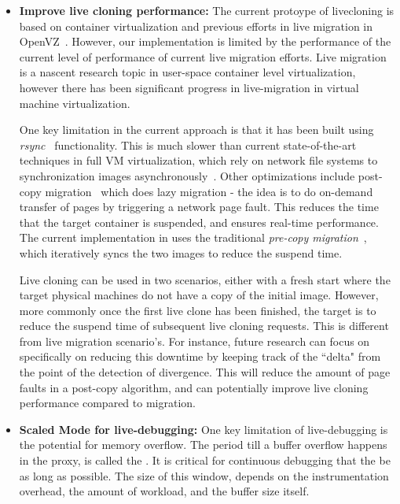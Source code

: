 \begin{itemize}
	\item \textbf{Improve live cloning performance:}
	The current protoype of livecloning is based on container virtualization and previous efforts in live migration in OpenVZ~\cite{openvz}.
	However, our implementation is limited by the performance of the current level of performance of current live migration efforts.
	Live migration is a nascent research topic in user-space container level virtualization, however there has been significant progress in live-migration in virtual machine virtualization.
	
	One key limitation in the current approach is that it has been built using \emph{rsync}~\cite{rsync} functionality. This is much slower than current state-of-the-art techniques in full VM virtualization, which rely on network file systems to synchronization images asynchronously~\cite{nfs}. Other optimizations include post-copy migration~\cite{postcopy} which does lazy migration - the idea is to do on-demand transfer of pages by triggering a network page fault. 
	This reduces the time that the target container is suspended, and ensures real-time performance.
	The current implementation in \parikshan uses the traditional \emph{pre-copy migration}~\cite{clark2005live}, which iteratively syncs the two images to reduce the suspend time.
	
	Live cloning can be used in two scenarios, either with a fresh start where the target physical machines do not have a copy of the initial image. 
	However, more commonly once the first live clone has been finished, the target is to reduce the suspend time of subsequent live cloning requests. 
	This is different from live migration scenario's.
	For instance, future research can focus on specifically on reducing this downtime by keeping track of the ``delta" from the point of the detection of divergence.
	This will reduce the amount of page faults in a post-copy algorithm, and can potentially improve live cloning performance compared to migration.
	
	
	\item \textbf{Scaled Mode for live-debugging:}
	One key limitation of live-debugging is the potential for memory overflow. The period till a buffer overflow happens in the proxy, is called the \debugwindow. It is critical for continuous debugging that the \debugwindow be as long as possible.
	The size of this window, depends on the instrumentation overhead, the amount of workload, and the buffer size itself. 
	

\end{itemize}
